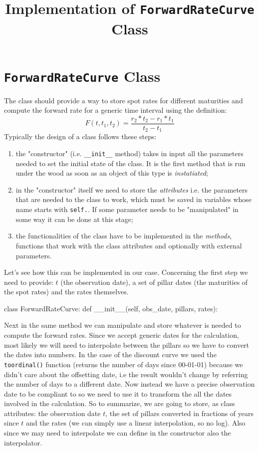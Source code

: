 \documentclass[]{article}
\title{Implementation of \texttt{ForwardRateCurve} Class}
\author{}
\begin{document}
\maketitle

\section{\texttt{ForwardRateCurve} Class}
The class should provide a way to store spot rates for different maturities and compute the forward rate for a generic time interval using the definition:
\begin{equation}
F(t, t_1, t_2) = \frac{r_2*t_2 - r_1*t_1}{t_2 - t_1}
\label{eq:forward_rate}
\end{equation}
Typically the design of a class follows these steps:
\begin{enumerate}
	\item the "constructor" (i.e. \texttt{\_\_init\_\_} method) takes in input all the parameters needed to set the initial state of the class. It is the first method that is run under the wood as soon as an object of this type is \emph{instatiated};
	\item in the "constructor" itself we need to store the \emph{attributes} i.e. the parameters that are needed to the class to work, which must be saved in variables whose name starts with \texttt{self.}. If some parameter needs to be "manipulated" in some way it can be done at this stage;
	\item the functionalities of the class have to be implemented in the \emph{methods}, functions that work with the class attributes and optionally with external parameters.
\end{enumerate}

Let's see how this can be implemented in our case. Concerning the first step we need to provide: $t$ (the observation date), a set of pillar dates (the maturities of the spot rates) and the rates themselves.

\begin{ipython}
class ForwardRateCurve:
    def __init__(self, obs_date, pillars, rates):
\end{ipython}

Next in the same method we can manipulate and store whatever is needed to compute the forward rates. Since we accept generic dates for the calculation, most likely we will need to interpolate between the pillars so we have to convert the dates into numbers. In the case of the discount curve we used the \texttt{toordinal()} function (returns the number of days since 00-01-01) because we didn't care about the offsetting date, i.e the result wouldn't change by referring the number of days to a different date. Now instead we have a precise observation date to be compliant to so we need to use it to transform the all the dates involved in the calculation. So to summarize, we are going to store, as class attributes: the observation date $t$, the set of pillars converted in fractions of years since $t$ and the rates (we can simply use a linear interpolation, so no log). Also since we may need to interpolate we can define in the constructor also the interpolator.
\end{document}
